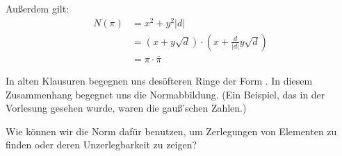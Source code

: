 \documentclass[a4paper,9pt]{scrartcl}
\begin{document}
Außerdem gilt:
\begin{align*}
  N(\pi) &= x^2+y^2 |d|\\
         &= (x+y\sqrt{d}) \cdot (x+\frac{d}{|d|}y\sqrt{d})\\
		 &= \pi \cdot \overline{\pi}
\end{align*}


In alten Klausuren begegnen uns desöfteren Ringe der Form . 
In diesem Zusammenhang begegnet uns die Normabbildung. 
(Ein Beispiel, das in der Vorlesung gesehen wurde, waren die gauß'schen Zahlen.)

Wie können wir die Norm dafür benutzen, um Zerlegungen von Elementen zu finden oder deren Unzerlegbarkeit zu zeigen?
\end{document}
